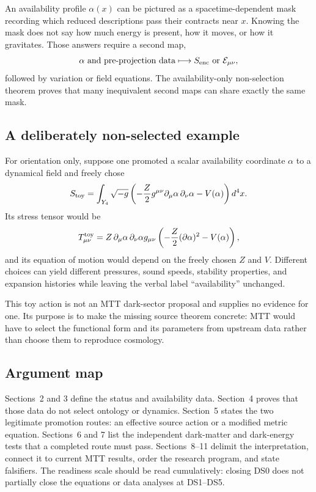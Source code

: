 \documentclass[11pt]{article}
\begin{document}
An availability profile $\alpha(x)$ can be pictured as a spacetime-dependent
mask recording which reduced descriptions pass their contracts near $x$.
Knowing the mask does not say how much energy is present, how it moves, or how
it gravitates.  Those answers require a second map,
\[
 \alpha\ \hbox{and pre-projection data}
 \longmapsto
 S_{\rm enc}\ \hbox{or}\ \mathcal E_{\mu\nu},
\]
followed by variation or field equations.  The
availability-only non-selection theorem proves that many inequivalent second
maps can share exactly the same mask.

\subsection{A deliberately non-selected example}

For orientation only, suppose one promoted a scalar availability coordinate
$\alpha$ to a dynamical field and freely chose
\[
 S_{\rm toy}
 =
 \int_{Y_4}\sqrt{-g}
 \left(
 -\frac{Z}{2}g^{\mu\nu}\partial_\mu\alpha\,\partial_\nu\alpha
 -V(\alpha)
 \right)d^4x .
\]
Its stress tensor would be
\[
 T_{\mu\nu}^{\rm toy}
 =
 Z\,\partial_\mu\alpha\,\partial_\nu\alpha
 g_{\mu\nu}
 \left(
 -\frac{Z}{2}(\partial\alpha)^2-V(\alpha)
 \right),
\]
and its equation of motion would depend on the freely chosen $Z$ and
$V$.  Different choices can yield different pressures, sound speeds,
stability properties, and expansion histories while leaving the verbal label
``availability'' unchanged.

This toy action is not an MTT dark-sector proposal and supplies no evidence for
one.  Its purpose is to make the missing source theorem concrete: MTT would
have to select the functional form and its parameters from upstream data
rather than choose them to reproduce cosmology.

\subsection{Argument map}

Sections~2 and 3 define the status and availability data.
Section~4 proves that those data do not select ontology or dynamics.
Section~5 states the two legitimate promotion routes: an effective source
action or a modified metric equation.  Sections~6 and 7 list the independent
dark-matter and dark-energy tests that a completed route must pass.
Sections~8--11 delimit the interpretation, connect it to current MTT results,
order the research program, and state falsifiers.  The readiness
scale should be read cumulatively: closing DS0 does not partially close the
equations or data analyses at DS1--DS5.
\end{document}
